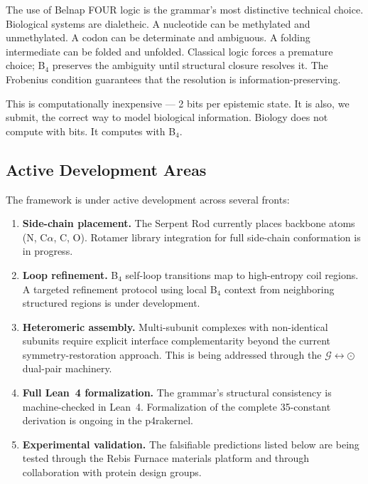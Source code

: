 \documentclass[11pt,a4paper,twocolumn]{article}
\begin{document}
The use of Belnap FOUR logic is the grammar's most distinctive technical choice. Biological systems are dialetheic. A nucleotide can be methylated and unmethylated. A codon can be determinate and ambiguous. A folding intermediate can be folded and unfolded. Classical logic forces a premature choice; B$_4$ preserves the ambiguity until structural closure resolves it. The Frobenius condition guarantees that the resolution is information-preserving.

This is computationally inexpensive — 2 bits per epistemic state. It is also, we submit, the correct way to model biological information. Biology does not compute with bits. It computes with B$_4$.

\subsection{Active Development Areas}

The framework is under active development across several fronts:

\begin{enumerate}
\item \textbf{Side-chain placement.} The Serpent Rod currently places backbone atoms (N, C$\alpha$, C, O). Rotamer library integration for full side-chain conformation is in progress.

\item \textbf{Loop refinement.} B$_4$ self-loop transitions map to high-entropy coil regions. A targeted refinement protocol using local B$_4$ context from neighboring structured regions is under development.

\item \textbf{Heteromeric assembly.} Multi-subunit complexes with non-identical subunits require explicit interface complementarity beyond the current symmetry-restoration approach. This is being addressed through the $\mathcal{G} \leftrightarrow \odot$ dual-pair machinery.

\item \textbf{Full Lean~4 formalization.} The grammar's structural consistency is machine-checked in Lean~4. Formalization of the complete 35-constant derivation is ongoing in the p4rakernel.

\item \textbf{Experimental validation.} The falsifiable predictions listed below are being tested through the Rebis Furnace materials platform and through collaboration with protein design groups.
\end{enumerate}
\end{document}
